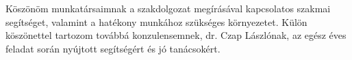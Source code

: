 \chapter*{\koszonetnyilvanitas}

Köszönöm munkatársaimnak a szakdolgozat megírásával kapcsolatos szakmai segítséget, valamint a hatékony munkához szükséges környezetet. Külön köszönettel tartozom továbbá konzulensemnek, dr. Czap Lászlónak, az egész éves feladat során nyújtott segítségért és jó tanácsokért.